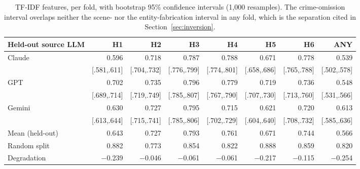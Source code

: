 \begin{table}[H]
\caption{TF-IDF features, per fold, with bootstrap 95\% confidence intervals
(1{,}000 resamples). The crime-omission interval overlaps neither the scene- nor
the entity-fabrication interval in any fold, which is the separation cited in
Section~\ref{sec:inversion}.}
\label{tab:logoci}
\centering\footnotesize
\setlength{\tabcolsep}{3pt}
\begin{tabular}{lrrrrrrr}
\toprule
Held-out source LLM & H1 & H2 & H3 & H4 & H5 & H6 & ANY \\
\midrule
\multirow{2}{*}{Claude}
 & 0.596 & 0.718 & 0.787 & 0.788 & 0.671 & 0.778 & 0.539 \\
 & \tiny[.581,.611] & \tiny[.704,.732] & \tiny[.776,.799] & \tiny[.774,.801] & \tiny[.658,.686] & \tiny[.765,.788] & \tiny[.502,.578] \\
\multirow{2}{*}{GPT}
 & 0.702 & 0.735 & 0.796 & 0.779 & 0.719 & 0.736 & 0.548 \\
 & \tiny[.689,.714] & \tiny[.719,.749] & \tiny[.785,.807] & \tiny[.767,.790] & \tiny[.707,.730] & \tiny[.713,.760] & \tiny[.531,.566] \\
\multirow{2}{*}{Gemini}
 & 0.630 & 0.727 & 0.795 & 0.715 & 0.621 & 0.720 & 0.613 \\
 & \tiny[.613,.644] & \tiny[.715,.741] & \tiny[.785,.806] & \tiny[.702,.729] & \tiny[.604,.640] & \tiny[.708,.732] & \tiny[.585,.636] \\
\midrule
Mean (held-out)  & 0.643 & 0.727 & 0.793 & 0.761 & 0.671 & 0.744 & 0.566 \\
Random split     & 0.882 & 0.773 & 0.854 & 0.822 & 0.888 & 0.859 & 0.820 \\
Degradation      & $-$0.239 & $-$0.046 & $-$0.061 & $-$0.061 & $-$0.217 & $-$0.115 & $-$0.254 \\
\bottomrule
\end{tabular}
\end{table}

